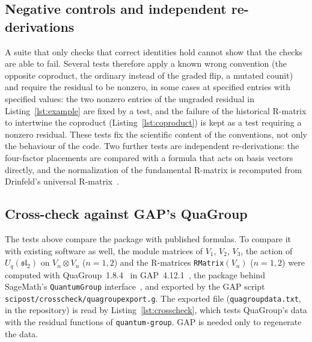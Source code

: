 \documentclass{SciPost}
\newcommand{\pkg}{\texttt{quantum-group}}
\newcommand{\code}[1]{\texttt{\begingroup\def\_{\textunderscore\allowbreak}#1\endgroup}}
\newcommand{\Uq}{U_q(\mathfrak{sl}_2)}
\begin{document}
\subsection{Negative controls and independent re-derivations}

A suite that only checks that correct identities hold cannot show that the checks are able to fail. Several tests therefore apply a known wrong convention (the opposite coproduct, the ordinary instead of the graded flip, a mutated counit) and require the residual to be nonzero, in some cases at specified entries with specified values: the two nonzero entries of the ungraded residual in Listing~\ref{lst:example} are fixed by a test, and the failure of the historical R-matrix to intertwine the coproduct (Listing~\ref{lst:coproduct}) is kept as a test requiring a nonzero residual. These tests fix the scientific content of the conventions, not only the behaviour of the code. Two further tests are independent re-derivations: the four-factor placements are compared with a formula that acts on basis vectors directly, and the normalization of the fundamental R-matrix is recomputed from Drinfeld's universal R-matrix~\cite{drinfeld1987}.

\subsection{Cross-check against GAP's QuaGroup}
\label{sec:crosscheck}

The tests above compare the package with published formulas. To compare it with existing software as well, the module matrices of $V_1$, $V_2$, $V_3$, the action of $\Uq$ on $V_n\otimes V_n$ ($n=1,2$) and the R-matrices \code{RMatrix}$(V_n)$ ($n=1,2$) were computed with QuaGroup~1.8.4~\cite{quagroup,degraaf2001} in GAP~4.12.1~\cite{gap}, the package behind SageMath's \code{QuantumGroup} interface~\cite{sagemath}, and exported by the GAP script \code{scipost/crosscheck/quagroup\_export.g}. The exported file (\code{quagroup\_data.txt}, in the repository) is read by Listing~\ref{lst:crosscheck}, which tests QuaGroup's data with the residual functions of \pkg{}. GAP is needed only to regenerate the data.
\end{document}
